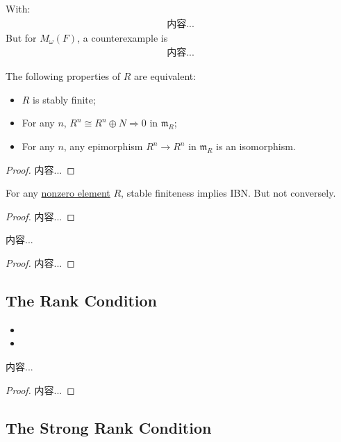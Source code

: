 \documentclass[Total.tex]{subfiles}
\begin{document}
	With:
	\begin{gather*}
		内容...
	\end{gather*}
	But for $M_{\omega}(F)$, a counterexample is
	\begin{gather*}
		内容...
	\end{gather*}
	\begin{proposition}
		The following properties of $R$ are equivalent:
		
		\begin{itemize}
			\item $R$ is stably finite;
			\item For any $n$, $R^n\cong R^n\oplus N\Rightarrow 0$ in $\mathfrak{m}_R$;
			\item For any $n$, any epimorphism $R^n\rightarrow R^n$ in $\mathfrak{m}_R$ is an isomorphism.
		\end{itemize}
	\end{proposition}
	\begin{proof}
		内容...
	\end{proof}
	
	\begin{proposition}
		For any \underline{nonzero element} $R$, stable finiteness implies IBN. But not conversely.
	\end{proposition}
	
	\begin{proof}
		内容...
	\end{proof}
	
	\begin{proposition}
		内容...
	\end{proposition}
	\begin{proof}
		内容...
	\end{proof}
	\subsection{The Rank Condition}
	\begin{Def}
		\begin{itemize}
			\item 
			\item 
		\end{itemize}
	\end{Def}
	
	\begin{proposition}
		内容...
	\end{proposition}
	\begin{proof}
		内容...
	\end{proof}
	\subsection{The Strong Rank Condition}
\end{document}
